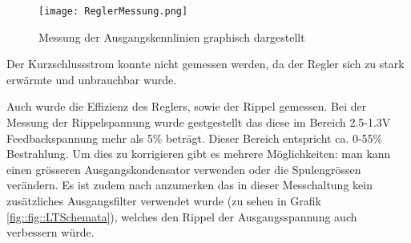 \begin{figure}[h]
\texttt{[image: ReglerMessung.png]}%
\caption{Messung der Ausgangskennlinien graphisch dargestellt}
\label{fig::Reglermessung}
\end{figure}

Der Kurzschlussstrom konnte nicht gemessen werden, da der Regler sich zu stark erwärmte und unbrauchbar wurde.

Auch wurde die Effizienz des Reglers, sowie der Rippel gemessen.
Bei der Messung der Rippelspannung wurde gestgestellt das diese im Bereich 2.5-1.3V Feedbackspannung mehr als 5\% beträgt. Dieser Bereich entspricht ca. 0-55\% Bestrahlung. Um dies zu korrigieren gibt es mehrere Möglichkeiten: man kann einen grösseren Ausgangskondensator verwenden oder die Spulengrössen verändern. Es ist zudem nach anzumerken das in dieser Messchaltung kein zusätzliches Ausgangsfilter verwendet wurde (zu sehen in Grafik \ref{fig::fig::LTSchemata}), welches den Rippel der Ausgangsspannung auch verbessern würde.


